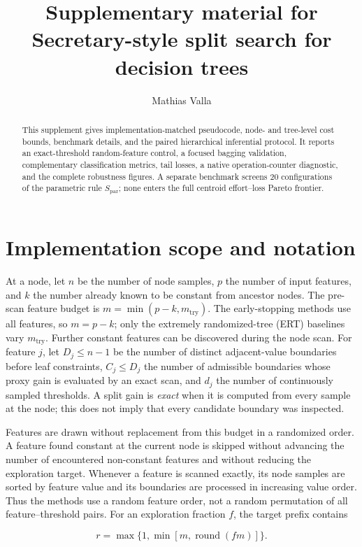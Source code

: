 \documentclass[final,5p,times,twocolumn]{elsarticle}
\newcommand{\suppabstracttext}{This supplement gives implementation-matched pseudocode, node- and tree-level cost bounds, benchmark details, and the paired hierarchical inferential protocol. It reports an exact-threshold random-feature control, a focused bagging validation, complementary classification metrics, tail losses, a native operation-counter diagnostic, and the complete robustness figures. A separate benchmark screens 20 configurations of the parametric rule \(S_{\mathrm{par}}\); none enters the full centroid effort--loss Pareto frontier.}
\begin{document}
\begin{frontmatter}
\title{Supplementary material for\\
Secretary-style split search for decision trees}

\author[inst1]{Mathias Valla}
\address[inst1]{Chaire DIALog, Institut Louis Bachelier, 28 Place de la Bourse, 75002 Paris, France}

\begin{abstract}
\suppabstracttext
\end{abstract}

\end{frontmatter}

\section{Implementation scope and notation}
\label{sec:supp_scope}

At a node, let \(n\) be the number of node samples, \(p\) the number of input
features, and \(k\) the number already known to be constant from ancestor
nodes.  The pre-scan feature budget is
\(m=\min(p-k,m_{\mathrm{try}})\).  The early-stopping methods use all features,
so \(m=p-k\); only the extremely randomized-tree (ERT) baselines vary
\(m_{\mathrm{try}}\).  Further constant features can be discovered during the
node scan.  For
feature \(j\), let \(D_j\leq n-1\) be the number of distinct adjacent-value
boundaries before leaf constraints, \(C_j\leq D_j\) the number of admissible
boundaries whose proxy gain is evaluated by an exact scan, and \(d_j\) the
number of continuously sampled thresholds.  A split gain is \emph{exact} when
it is computed from every sample at the node; this does not imply that every
candidate boundary was inspected.

Features are drawn without replacement from this budget in a randomized order.
A feature found constant at the current node is skipped without advancing the
number of encountered non-constant features and without reducing the
exploration target.  Whenever a feature is scanned exactly, its node samples are sorted by feature value and
its boundaries are processed in increasing value order.  Thus the methods use
a random feature order, not a random permutation of all feature--threshold
pairs.  For an exploration fraction \(f\), the target prefix contains

\[
 r=\max\{1,\min[m,\operatorname{round}(fm)]\}.
\]
\end{document}
